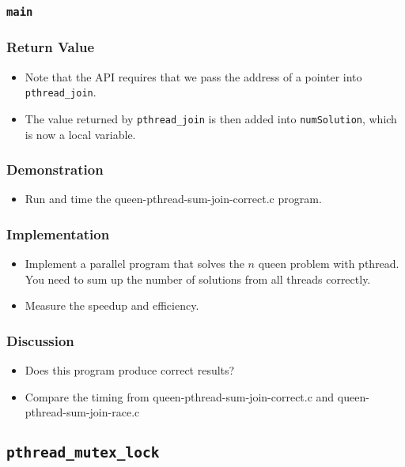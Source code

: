 \documentclass{beamer}
\begin{document}
\begin{frame}
\frametitle{\tt main}
\end{frame}

\begin{frame}
\frametitle{Return Value}
\begin{itemize}
\item Note that the API requires that we pass the address of a pointer
  into {\tt pthread\_join}.
\item The value returned by {\tt pthread\_join} is then added into
  {\tt numSolution}, which is now a local variable.
\end{itemize}
\end{frame}

\begin{frame}
\frametitle{Demonstration}
\begin{itemize}
\item Run and time the queen-pthread-sum-join-correct.c program.
\end{itemize}
\end{frame}

\begin{frame}
\frametitle{Implementation}
\begin{itemize}
\item Implement a parallel program that solves the $n$ queen problem
  with pthread.  You need to sum up the number of solutions from all
  threads correctly.
\item Measure the speedup and efficiency.
\end{itemize}
\end{frame}

\begin{frame}
\frametitle{Discussion}
\begin{itemize}
\item Does this program produce correct results?
\item Compare the timing from queen-pthread-sum-join-correct.c and
  queen-pthread-sum-join-race.c
\end{itemize}
\end{frame}

\subsection{\tt pthread\_mutex\_lock}
\end{document}
